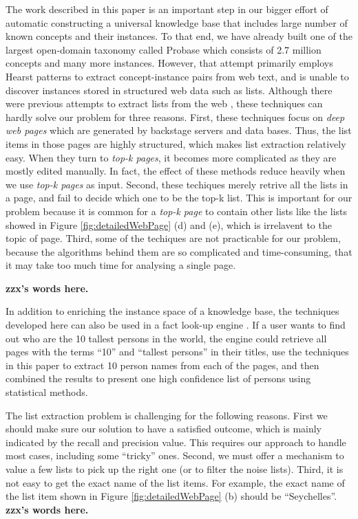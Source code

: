 The work described in this paper is an important step in our bigger effort of
automatic constructing a universal knowledge base that includes large number 
of known concepts and their instances. To that end, we have already built one of
the largest open-domain taxonomy called Probase \cite{wentao} 
which consists of 2.7 million concepts and many more instances. 
However, that attempt primarily employs Hearst 
patterns \cite{Hearst92} to extract concept-instance pairs from web text, and
is unable to discover instances stored in structured web data such as
lists. Although there were previous attempts to extract lists from the web 
\cite{Lerman01:AutomaticData,LiuGZ03:MDR,MiaoTHSM09:TagPathClustering,
FumarolaWBMH11:HyLiEn}, 
these techniques can hardly solve our problem for three reasons.
First, these techniques focus on {\em deep web pages} 
which are generated by backstage servers and data bases. 
Thus, the list items in those pages are highly structured, 
which makes list extraction relatively easy.
When they turn to {\em top-k pages}, 
it becomes more complicated as they are mostly edited manually.
In fact, the effect of these methods reduce heavily when we use {\em top-k pages} as input.
Second, these techiques merely retrive all the lists in a page, 
and fail to decide which one to be the top-k list.
This is important for our problem 
because it is common for a {\em top-k page} to contain other lists 
like the lists showed in Figure \ref{fig:detailedWebPage} (d) and (e),
which is irrelavent to the topic of page.
Third, some of the techiques are not practicable for our problem,
because the algorithms behind them are so complicated and time-consuming,
that it may take too much time for analysing a single page.

{\bf zzx's words here.}

In addition to enriching the instance space of a knowledge base, the techniques
developed here can also be used in a fact look-up engine \cite{YinTL11:Facto}. 
If a user wants to find out who are the 10 tallest persons in the world, the 
engine could retrieve all pages with the terms ``10'' and ``tallest persons''
in their titles, use the techniques in this paper to extract 10
person names from each of the pages, and then combined the results to present
one high confidence list of persons using statistical methods.

The list extraction problem is challenging for the following reasons.
First we should make sure our solution to have a satisfied outcome, 
which is mainly indicated by the recall and precision value.
This requires our approach to handle most cases, including some ``tricky'' ones.
Second, we must offer a mechanism to value a few lists to pick up the right one
(or to filter the noise lists).
Third, it is not easy to get the exact name of the list items. For example, 
the exact name of the list item shown in Figure \ref{fig:detailedWebPage} (b) should be ``Seychelles''.
{\bf zzx's words here.}

